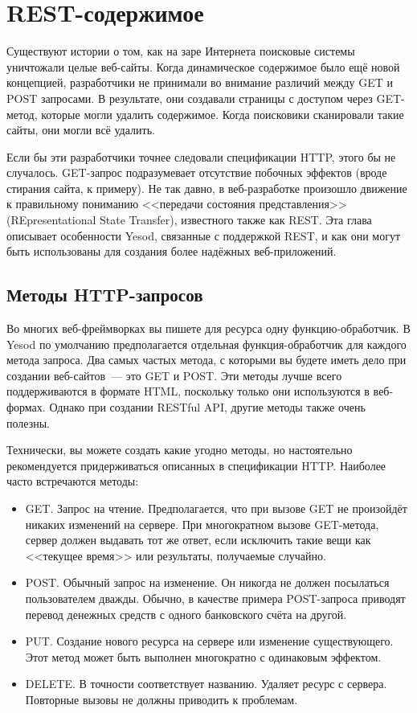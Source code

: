 \chapter{REST-содержимое}\label{chap:restful-content}

Существуют истории о том, как  на заре Интернета поисковые системы
уничтожали целые веб-сайты. Когда динамическое содержимое было ещё новой концепцией,
разработчики не принимали во внимание различий между GET и POST запросами. В результате,
они создавали страницы с доступом через GET-метод, которые могли удалить содержимое. Когда
поисковики сканировали такие сайты, они могли всё удалить.

Если бы эти разработчики точнее следовали спецификации HTTP, этого бы не случалось.
GET-запрос подразумевает отсутствие побочных эффектов (вроде стирания сайта, к примеру).
Не так давно, в веб-разработке произошло движение к правильному пониманию <<передачи
состояния представления>> (REpresentational State Transfer), известного также как REST.
Эта
глава описывает особенности Yesod, связанные с поддержкой REST, и как они могут быть
использованы для создания более надёжных веб-приложений.

\section{Методы HTTP-запросов}

Во многих веб-фреймворках вы пишете для ресурса одну функцию-обработчик. В
Yesod по умолчанию предполагается отдельная функция-обработчик для каждого метода
запроса. Два самых частых метода, с которыми вы будете иметь дело при создании веб-сайтов~---
это GET и POST. Эти методы лучше всего поддерживаются в формате HTML, поскольку только
они используются в веб-формах. Однако при создании RESTful API, другие методы также очень
полезны.

Технически, вы можете создать какие угодно методы, но настоятельно рекомендуется
придерживаться описанных в спецификации HTTP. Наиболее часто встречаются методы:
\begin{itemize}
 \item GET. Запрос на чтение. Предполагается, что при вызове GET не произойдёт никаких
 изменений на сервере. При многократном вызове GET-метода, сервер должен выдавать тот же
ответ, если исключить такие вещи как <<текущее время>> или результаты, получаемые
случайно.
 \item POST. Обычный запрос на изменение. Он никогда не должен посылаться пользователем
дважды. Обычно, в качестве примера POST-запроса приводят перевод денежных средств с
одного банковского счёта на другой.
 \item PUT. Создание нового ресурса на сервере или изменение существующего. Этот метод
 может быть выполнен многократно с одинаковым эффектом.
 \item DELETE. В точности соответствует названию. Удаляет ресурс с сервера. Повторные
 вызовы не должны приводить к проблемам.
\end{itemize}


